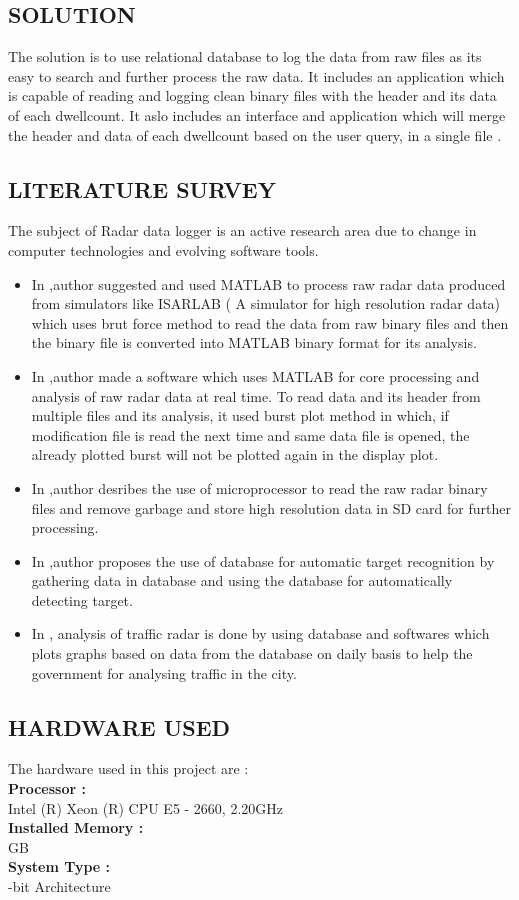 \documentclass[12pt]{article} %
\begin{document}
\subsection{SOLUTION} 
 The solution is to use relational database to log the data from raw files as its easy to search and further process the raw data. It  includes an application which is capable of reading and logging clean binary files with the header and its data of each dwellcount.
 It aslo includes an interface and application which will merge the header and data of each dwellcount based on the user query,  in a single file .
 
 \subsection{LITERATURE SURVEY}
 The subject of Radar data logger is an active research area due to change in computer technologies and evolving software tools.
 \begin{itemize}
 \item In \cite{DUMMY:1},author suggested and used MATLAB to process raw radar data produced from simulators like ISARLAB ( A simulator for high resolution radar data) which uses brut force method to read the data from raw binary files and then the binary file is converted into MATLAB binary format for its analysis.
 \item In \cite{DUMMY:2},author made a software which uses MATLAB for core processing and analysis of raw radar data at real time. To read data and its header from multiple files and its analysis, it used burst plot method in which, if modification file is read the next time and same data file is opened, the already plotted burst will not be plotted again in the display plot.
 \item In \cite{DUMMY:3},author desribes the use of microprocessor to read the raw radar binary files and remove garbage and store high resolution data in SD card for further processing.
 \item In \cite{DUMMY:4},author proposes the use of database for automatic target recognition by gathering data in database and using the database for automatically detecting target.
 \item In \cite{DUMMY:5}, analysis of traffic radar is done by using database and softwares which plots graphs based on data from the database on daily basis to help the government for analysing traffic in the city.
 \end{itemize}

\subsection{HARDWARE USED}
\noindent The hardware used in this project are :\\
\textbf{Processor : } \\
\indent Intel (R) Xeon (R) CPU E5 - 2660, 2.20GHz\\
\textbf{Installed Memory : }\\
 GB\\
 \textbf{System Type : }\\
 -bit Architecture
 
\end{document}
